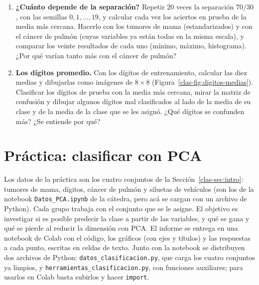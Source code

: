 \begin{enumerate}[leftmargin=*,label=\textbf{\thechapter.\arabic*},ref=\thechapter.\arabic*,itemsep=4pt]
\item {} \textbf{¿Cuánto depende de la separación?}\label{clas-ej:semillas}
Repetir $20$ veces la separación $70/30$, con las semillas $0,1,\dots,19$, y
calcular cada vez los aciertos en prueba de la media más cercana. Hacerlo con
los tumores de mama (estandarizados) y con el cáncer de pulmón (cuyas
variables ya están todas en la misma escala), y comparar los veinte resultados de cada uno (mínimo, máximo,
histograma). ¿Por qué varían tanto más con el cáncer de pulmón?

\item {} \textbf{Los dígitos promedio.} Con los dígitos de
entrenamiento, calcular las diez medias y dibujarlas como imágenes de
$8\times8$ (Figura~\ref{clas-fig:digitos-medias}). Clasificar los dígitos de
prueba con la media más cercana, mirar la matriz de confusión y dibujar
algunos dígitos mal clasificados al lado de la media de su clase y de la media
de la clase que se les asignó. ¿Qué dígitos se confunden más? ¿Se entiende
por qué?

\end{enumerate}

\section*{Práctica: clasificar con PCA}

Los datos de la práctica son los cuatro conjuntos de la
Sección~\ref{clas-sec:intro}: tumores de mama, dígitos, cáncer de pulmón y
siluetas de vehículos (son los de la notebook \texttt{Datos\_PCA.ipynb} de la
cátedra, pero acá se cargan con un archivo de Python). Cada grupo trabaja con
el conjunto que se le asigne. El objetivo es investigar si es posible predecir
la clase a partir de las variables, y qué se gana y qué se pierde al reducir la
dimensión con PCA. El informe se entrega en una notebook de Colab con el
código, los gráficos (con ejes y títulos) y las respuestas a cada punto,
escritas en celdas de texto. Junto con la notebook se distribuyen dos archivos
de Python: \texttt{datos\_clasificacion.py}, que carga los cuatro conjuntos ya
limpios, y \texttt{herramientas\_clasificacion.py}, con funciones auxiliares;
para usarlos en Colab basta subirlos y hacer \texttt{import}.

